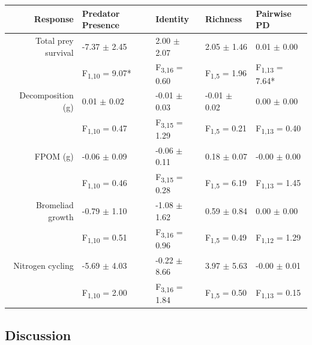 \begin{tabular}{rllll}

\toprule 
Response                & Predator Presence               & Identity                         & Richness                      & Pairwise PD                      \\ \midrule
Total prey survival     & -7.37 $\pm$ 2.45               & 2.00 $\pm$ 2.07               & 2.05 $\pm$ 1.46              & 0.01 $\pm$ 0.00                \\
                         & F\textsubscript{1,10} = 9.07* & F\textsubscript{3,16} = 0.60 & F\textsubscript{1,5} = 1.96  & F\textsubscript{1,13} = 7.64* \\
Decomposition (g)      & 0.01 $\pm$ 0.02                & -0.01 $\pm$ 0.03             & -0.01 $\pm$ 0.02             & 0.00 $\pm$ 0.00                \\
                          & F\textsubscript{1,10} = 0.47  & F\textsubscript{3,15} = 1.29 & F\textsubscript{1,5} = 0.21  & F\textsubscript{1,13} = 0.40   \\
FPOM (g)               & -0.06 $\pm$ 0.09                & -0.06 $\pm$ 0.11             & 0.18 $\pm$ 0.07              & -0.00 $\pm$ 0.00               \\
                         & F\textsubscript{1,10} = 0.46   & F\textsubscript{3,15} = 0.28 & F\textsubscript{1,5} = 6.19  & F\textsubscript{1,13} = 1.45  \\
Bromeliad growth       & -0.79 $\pm$ 1.10               & -1.08 $\pm$ 1.62             & 0.59 $\pm$ 0.84               & 0.00 $\pm$ 0.00                \\
                         & F\textsubscript{1,10} = 0.51   & F\textsubscript{3,16} = 0.96 & F\textsubscript{1,5} = 0.49  & F\textsubscript{1,12} = 1.29   \\
Nitrogen cycling       & -5.69 $\pm$ 4.03                & -0.22 $\pm$ 8.66             & 3.97 $\pm$ 5.63               & -0.00 $\pm$ 0.01                \\
                         & F\textsubscript{1,10} = 2.00   & F\textsubscript{3,16} = 1.84 & F\textsubscript{1,5} = 0.50  &  F\textsubscript{1,13} = 0.15   \\
\bottomrule
\end{tabular}

\subsection{Discussion}\label{discussion}

